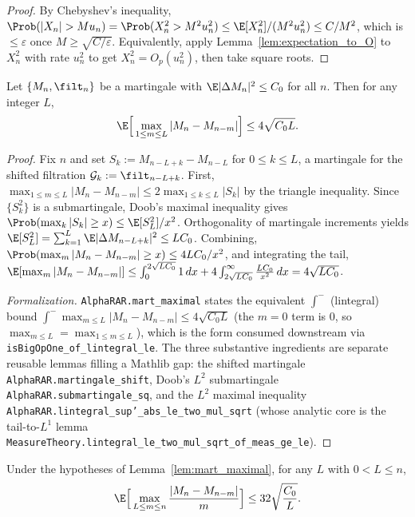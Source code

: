 \begin{proof}\leanok
{}
By Chebyshev's inequality, $\Prob(|X_n| > M u_n) = \Prob(X_n^2 > M^2 u_n^2)
\le \E[X_n^2]/(M^2 u_n^2) \le C/M^2$, which is $\le \varepsilon$ once
$M \ge \sqrt{C/\varepsilon}$. Equivalently, apply Lemma~\ref{lem:expectation_to_O}
to $X_n^2$ with rate $u_n^2$ to get $X_n^2 = O_p(u_n^2)$, then take square roots.
\end{proof}

\begin{lemma}\label{lem:mart_maximal}
\leanok
Let $\{M_n, \filt_n\}$ be a martingale with $\E|\Delta M_n|^2 \le C_0$ for all
$n$. Then for any integer $L$,
\[
  \E\Big[\max_{1 \le m \le L} |M_n - M_{n-m}|\Big] \le 4\sqrt{C_0 L}.
\]
\end{lemma}

\begin{proof}\leanok
Fix $n$ and set $S_k := M_{n-L+k} - M_{n-L}$ for $0 \le k \le L$, a martingale for
the shifted filtration $\mathcal{G}_k := \filt_{n-L+k}$. First,
$\max_{1\le m\le L}|M_n - M_{n-m}| \le 2\max_{1\le k\le L}|S_k|$ by the triangle
inequality. Since $\{S_k^2\}$ is a submartingale, Doob's maximal inequality gives
$\Prob(\max_k |S_k| \ge x) \le \E[S_L^2]/x^2$. Orthogonality of martingale
increments yields $\E[S_L^2] = \sum_{k=1}^L \E|\Delta M_{n-L+k}|^2 \le L C_0$.
Combining, $\Prob(\max_m |M_n - M_{n-m}| \ge x) \le 4 L C_0 / x^2$, and integrating
the tail,
$\E[\max_m |M_n-M_{n-m}|] \le \int_0^{2\sqrt{LC_0}} 1\,dx
 + 4\int_{2\sqrt{LC_0}}^\infty \frac{LC_0}{x^2}\,dx = 4\sqrt{LC_0}$.

\emph{Formalization.} \texttt{AlphaRAR.mart\_maximal} states the equivalent $\int^-$ (lintegral)
bound $\int^- \max_{m\le L}|M_n - M_{n-m}| \le 4\sqrt{C_0 L}$ (the $m=0$ term is $0$, so
$\max_{m\le L}=\max_{1\le m\le L}$), which is the form consumed downstream via
\texttt{isBigOpOne\_of\_lintegral\_le}. The three substantive ingredients are separate reusable
lemmas filling a Mathlib gap: the shifted martingale \texttt{AlphaRAR.martingale\_shift}, Doob's
$L^2$ submartingale \texttt{AlphaRAR.submartingale\_sq}, and the $L^2$ maximal inequality
\texttt{AlphaRAR.lintegral\_sup'\_abs\_le\_two\_mul\_sqrt} (whose analytic core is the tail-to-$L^1$
lemma \texttt{MeasureTheory.lintegral\_le\_two\_mul\_sqrt\_of\_meas\_ge\_le}).
\end{proof}

\begin{lemma}\label{lem:mart_maximal_dyadic}
\leanok
Under the hypotheses of Lemma~\ref{lem:mart_maximal}, for any $L$ with
$0 < L \le n$,
\[
  \E\Big[\max_{L \le m \le n} \frac{|M_n - M_{n-m}|}{m}\Big] \le 32\sqrt{\frac{C_0}{L}}.
\]
\end{lemma}

